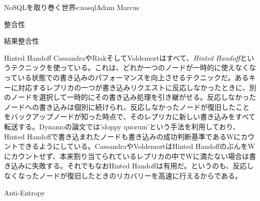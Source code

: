 \begin{aosachapter}{NoSQLを取り巻く世界}{s:nosql}{Adam Marcus}
\begin{aosasect1}{整合性}
\begin{aosasect2}{結果整合性}
\begin{aosasect3}{Hinted Handoff}
CassandraやRiakそしてVoldemortはすべて、\emph{Hinted Handoff}というテクニックを使っている。これは、どれか一つのノードが一時的に使えなくなっている状態での書き込みのパフォーマンスを向上させるテクニックだ。あるキーに対応するレプリカの一つが書き込みリクエストに反応しなかったときに、別のノードを選択して一時的にその書き込み処理を引き継がせる。反応しなかったノードへの書き込みは個別に続けられ、反応しなかったノードが復旧したことをバックアップノードが知った時点で、そのレプリカに新しい書き込みをすべて転送する。Dynamoの論文では'sloppy quorum'という手法を利用しており、Hinted Handoffで書き込まれたノードも書き込みの成功判断基準であるWにカウントできるようにしている。CassandraやVoldemortはHinted HandoffのぶんをWにカウントせず、本来割り当てられているレプリカの中でWに満たない場合は書き込みに失敗する。それでもなおHinted Handoffは有用だ。というのも、反応しなくなったノードが復旧したときのリカバリーを高速に行えるからである。

\end{aosasect3}

\begin{aosasect3}{Anti-Entropy}


\end{aosasect3}
\end{aosasect2}
\end{aosasect1}
\end{aosachapter}

